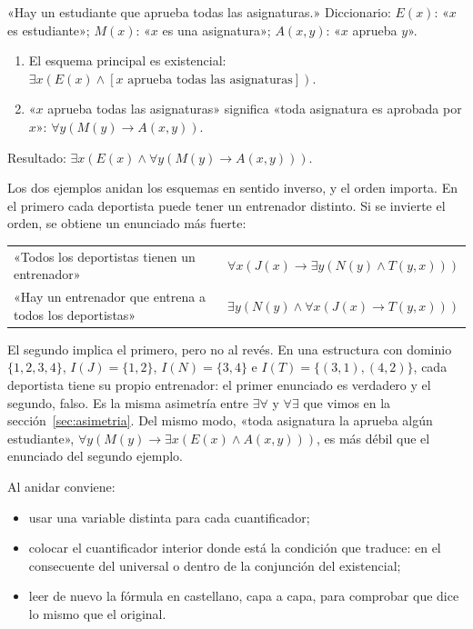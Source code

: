 \begin{ejemplo}
«Hay un estudiante que aprueba todas las asignaturas.» Diccionario: $E(x)$: «$x$ es estudiante»; $M(x)$: «$x$ es una asignatura»; $A(x, y)$: «$x$ aprueba $y$».
\begin{enumerate}
    \item El esquema principal es existencial: $\exists x (E(x) \land [x \text{ aprueba todas las asignaturas}])$.
    \item «$x$ aprueba todas las asignaturas» significa «toda asignatura es aprobada por $x$»: $\forall y (M(y) \to A(x, y))$.
\end{enumerate}
Resultado: $\exists x (E(x) \land \forall y (M(y) \to A(x, y)))$.
\end{ejemplo}

Los dos ejemplos anidan los esquemas en sentido inverso, y el orden importa. En el primero cada deportista puede tener un entrenador distinto. Si se invierte el orden, se obtiene un enunciado más fuerte:
\begin{center}
\begin{tabular}{ll}
«Todos los deportistas tienen un entrenador» & $\forall x (J(x) \to \exists y (N(y) \land T(y, x)))$ \\
«Hay un entrenador que entrena a todos los deportistas» & $\exists y (N(y) \land \forall x (J(x) \to T(y, x)))$
\end{tabular}
\end{center}
El segundo implica el primero, pero no al revés. En una estructura con dominio $\{1, 2, 3, 4\}$, $I(J) = \{1, 2\}$, $I(N) = \{3, 4\}$ e $I(T) = \{(3, 1), (4, 2)\}$, cada deportista tiene su propio entrenador: el primer enunciado es verdadero y el segundo, falso. Es la misma asimetría entre $\exists\forall$ y $\forall\exists$ que vimos en la sección~\ref{sec:asimetria}. Del mismo modo, «toda asignatura la aprueba algún estudiante», $\forall y (M(y) \to \exists x (E(x) \land A(x, y)))$, es más débil que el enunciado del segundo ejemplo.

Al anidar conviene:
\begin{itemize}
    \item usar una variable distinta para cada cuantificador;
    \item colocar el cuantificador interior donde está la condición que traduce: en el consecuente del universal o dentro de la conjunción del existencial;
    \item leer de nuevo la fórmula en castellano, capa a capa, para comprobar que dice lo mismo que el original.
\end{itemize}

